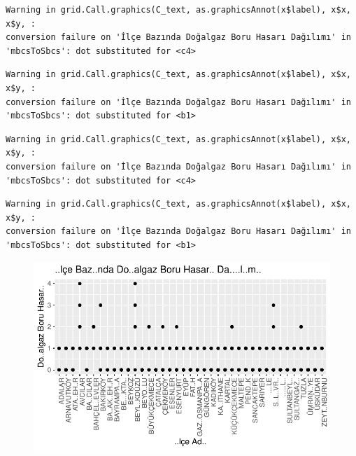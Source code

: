 \documentclass[
  11pt,
  a4paper,
  DIV=11,
  numbers=noendperiod]{scrartcl}
\begin{document}
\begin{verbatim}
Warning in grid.Call.graphics(C_text, as.graphicsAnnot(x$label), x$x, x$y, :
conversion failure on 'İlçe Bazında Doğalgaz Boru Hasarı Dağılımı' in
'mbcsToSbcs': dot substituted for <c4>
\end{verbatim}

\begin{verbatim}
Warning in grid.Call.graphics(C_text, as.graphicsAnnot(x$label), x$x, x$y, :
conversion failure on 'İlçe Bazında Doğalgaz Boru Hasarı Dağılımı' in
'mbcsToSbcs': dot substituted for <b1>
\end{verbatim}

\begin{verbatim}
Warning in grid.Call.graphics(C_text, as.graphicsAnnot(x$label), x$x, x$y, :
conversion failure on 'İlçe Bazında Doğalgaz Boru Hasarı Dağılımı' in
'mbcsToSbcs': dot substituted for <c4>
\end{verbatim}

\begin{verbatim}
Warning in grid.Call.graphics(C_text, as.graphicsAnnot(x$label), x$x, x$y, :
conversion failure on 'İlçe Bazında Doğalgaz Boru Hasarı Dağılımı' in
'mbcsToSbcs': dot substituted for <b1>
\end{verbatim}

\begin{figure}[H]

{\centering \includegraphics{project_files/figure-pdf/unnamed-chunk-5-1.pdf}

}

\end{figure}
\end{document}
